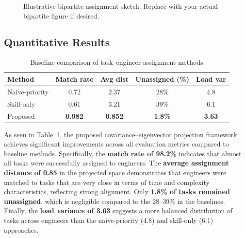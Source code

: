 \documentclass[journal]{IEEEtran}
\begin{document}
\begin{figure}[H]
\centering
{}
\caption{Illustrative bipartite assignment sketch. Replace with your actual bipartite figure if desired.}
\label{fig:assign_matrix}
\end{figure}

\subsection{Quantitative Results}
\begin{table}[H]
    \centering
    \caption{Baseline comparison of task--engineer assignment methods}
    \label{tab:baseline_comparison}
    \begin{tabular}{lcccc}
    \toprule
    Method & Match rate & Avg dist & Unassigned (\%) & Load var \\
    \midrule
    Naive-priority & 0.72 & 2.37 & 28\% & 4.8 \\
    Skill-only     & 0.61 & 3.21 & 39\% & 6.1 \\
    Proposed       & \textbf{0.982} & \textbf{0.852} & \textbf{1.8\%} & \textbf{3.63} \\
    \bottomrule
    \end{tabular}
\end{table}

As seen in Table~\ref{tab:baseline_comparison}, the proposed covariance--eigenvector projection framework
achieves significant improvements across all evaluation metrics compared to baseline methods.
Specifically, the \textbf{match rate of 98.2\%} indicates that almost all tasks were successfully assigned to engineers.
The \textbf{average assignment distance of 0.85} in the projected space demonstrates that engineers were matched
to tasks that are very close in terms of time and complexity characteristics, reflecting strong alignment.
Only \textbf{1.8\% of tasks remained unassigned}, which is negligible compared to the 28--39\% in the baselines.
Finally, the \textbf{load variance of 3.63} suggests a more balanced distribution of tasks across engineers
than the naive-priority (4.8) and skill-only (6.1) approaches.
\end{document}
